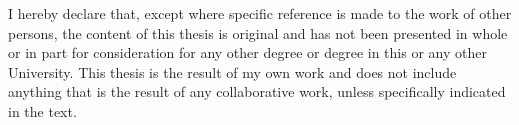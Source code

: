 
\begin{declaration}

I hereby declare that, except where specific reference is made to the work of other persons, the content of this thesis is original and has not been presented in whole or in part for consideration for any other degree or degree in this or any other University. This thesis is the result of my own work and does not include anything that is the result of any collaborative work, unless specifically indicated in the text. 


\end{declaration}
